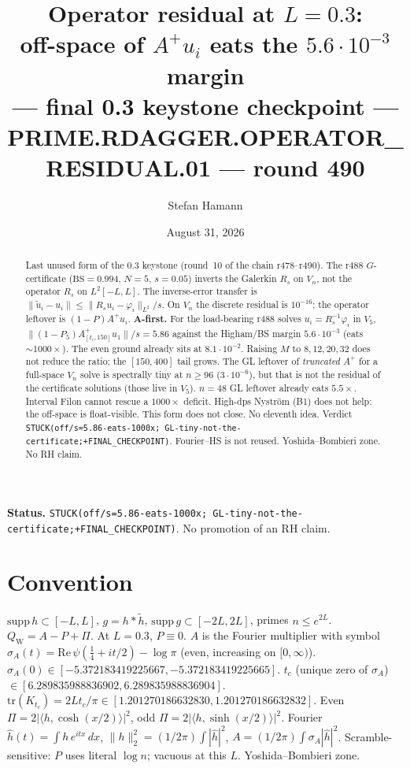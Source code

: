 \documentclass[11pt]{article}
\title{\bfseries Operator residual at $L=0.3$:\\[2mm]
off-space of $A^+u_i$ eats the $5.6\cdot10^{-3}$ margin\\[1mm]
--- final 0.3 keystone checkpoint ---\\[2mm]
\large PRIME.RDAGGER.OPERATOR\_RESIDUAL.01 --- round 490}
\author{Stefan Hamann}
\date{August 31, 2026}
\theoremstyle{remark}
\newcommand{\QW}{Q_{\mathrm W}}
\begin{document}
\maketitle

\begin{abstract}\noindent
Last unused form of the $0.3$ keystone
(round~10 of the chain r478--r490).
The r488 $G$-certificate
($\mathrm{BS}=0.994$, $N=5$, $s=0.05$)
inverts the Galerkin $R_s$ on $V_n$, not the
operator $R_s$ on $L^2[-L,L]$.
The inverse-error transfer is
$\|\widetilde u_i-u_i\|\le\|R_su_i-\varphi_i\|_{L^2}/s$.
On $V_n$ the discrete residual is $10^{-16}$;
the operator leftover is
$(1-P)A^+u_i$.
\textbf{A-first.}
For the load-bearing r488 solves
$u_i=R_s^{-1}\varphi_i$ in $V_5$,
$\|(1-P_5)A^+_{[t_c,150]}u_1\|/s=5.86$
against the Higham/BS margin $5.6\cdot10^{-3}$
(eats $\sim1000\times$).
The even ground already sits at $8.1\cdot10^{-2}$.
Raising $M$ to $8,12,20,32$ does not reduce
the ratio; the $[150,400]$ tail grows.
The GL leftover of \emph{truncated} $A^+$
for a full-space $V_n$ solve is spectrally tiny
at $n\ge96$ ($3\cdot10^{-6}$), but that is
not the residual of the certificate solutions
(those live in $V_5$).
$n=48$ GL leftover already eats $5.5\times$.
Interval Filon cannot rescue a $1000\times$
deficit.  High-dps Nystr\"om (B1) does not
help: the off-space is float-visible.
This form does not close.
No eleventh idea.
Verdict
\texttt{STUCK(off/s=5.86-eats-1000x; GL-tiny-not-the-certificate;+FINAL\_CHECKPOINT)}.
Fourier--HS is not reused.
Yoshida--Bombieri zone.  No RH claim.
\end{abstract}

\medskip\noindent
\textbf{Status.}\enspace
\texttt{STUCK(off/s=5.86-eats-1000x; GL-tiny-not-the-certificate;+FINAL\_CHECKPOINT)}.
No promotion of an RH claim.

\begin{center}
\end{center}

\section{Convention}

$\mathrm{supp}\,h\subset[-L,L]$, $g=h*\widetilde h$,
$\mathrm{supp}\,g\subset[-2L,2L]$, primes $n\le e^{2L}$.
$\QW=A-P+\Pi$.  At $L=0.3$, $P\equiv0$.
$A$ is the Fourier multiplier with symbol
$\sigma_A(t)=\mathrm{Re}\,\psi(\tfrac14+it/2)-\log\pi$
(even, increasing on $[0,\infty)$).
$\sigma_A(0)\in[-5.372183419225667,-5.372183419225665]$.
$t_c$ (unique zero of $\sigma_A$)
$\in[6.289835988836902,6.289835988836904]$.
$\mathrm{tr}(K_{t_c})=2Lt_c/\pi
\in[1.201270186632830,1.201270186632832]$.
Even $\Pi=2|\langle h,\cosh(x/2)\rangle|^2$,
odd $\Pi=2|\langle h,\sinh(x/2)\rangle|^2$.
Fourier $\hat h(t)=\int h\,e^{itx}\,dx$,
$\|h\|_2^2=(1/2\pi)\int|\hat h|^2$,
$A=(1/2\pi)\int\sigma_A|\hat h|^2$.
Scramble-sensitive: $P$ uses literal $\log n$;
vacuous at this $L$.
Yoshida--Bombieri zone.
\end{document}
